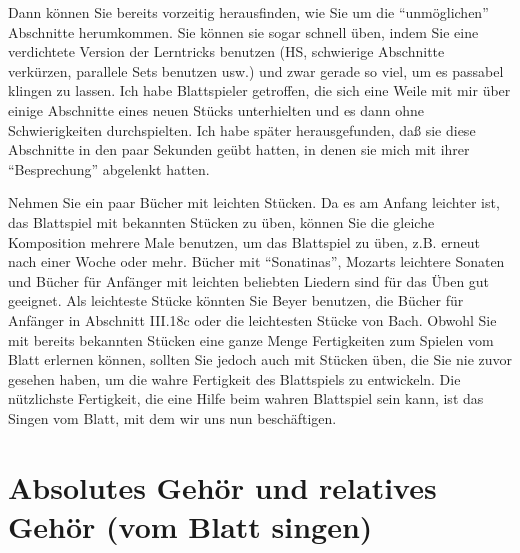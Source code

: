 Dann können Sie bereits vorzeitig herausfinden, wie Sie um die \enquote{unmöglichen} Abschnitte herumkommen.
Sie können sie sogar schnell üben, indem Sie eine verdichtete Version der Lerntricks benutzen (HS, schwierige Abschnitte verkürzen, parallele Sets benutzen usw.) und zwar gerade so viel, um es passabel klingen zu lassen.
Ich habe Blattspieler getroffen, die sich eine Weile mit mir über einige Abschnitte eines neuen Stücks unterhielten und es dann ohne Schwierigkeiten durchspielten.
Ich habe später herausgefunden, daß sie diese Abschnitte in den paar Sekunden geübt hatten, in denen sie mich mit ihrer \enquote{Besprechung} abgelenkt hatten.

Nehmen Sie ein paar Bücher mit leichten Stücken.
Da es am Anfang leichter ist, das Blattspiel mit bekannten Stücken zu üben, können Sie die gleiche Komposition mehrere Male benutzen, um das Blattspiel zu üben, z.B. erneut nach einer Woche oder mehr.
Bücher mit \enquote{Sonatinas}, Mozarts leichtere Sonaten und Bücher für Anfänger mit leichten beliebten Liedern sind für das Üben gut geeignet.
Als leichteste Stücke könnten Sie Beyer benutzen, die Bücher für Anfänger in Abschnitt III.18c oder die leichtesten Stücke von Bach. 
Obwohl Sie mit bereits bekannten Stücken eine ganze Menge Fertigkeiten zum Spielen vom Blatt erlernen können, sollten Sie jedoch auch mit Stücken üben, die Sie nie zuvor gesehen haben, um die wahre Fertigkeit des Blattspiels zu entwickeln.
Die nützlichste Fertigkeit, die eine Hilfe beim wahren Blattspiel sein kann, ist das Singen vom Blatt, mit dem wir uns nun beschäftigen.


\section{Absolutes Gehör und relatives Gehör (vom Blatt singen)}\hypertarget{c1iii12}{}

